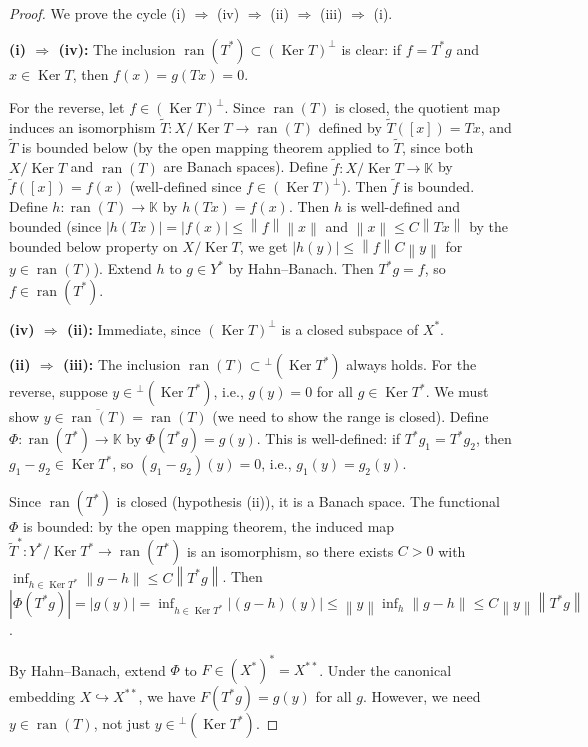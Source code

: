 \documentclass[a4paper,12pt]{book}
\DeclareMathOperator{\Ker}{Ker}
\DeclareMathOperator{\ran}{ran}
\newcommand{\K}{\mathbb{K}}
\newcommand{\norm}[1]{\left\| #1 \right\|}
\newcommand{\abs}[1]{\left| #1 \right|}
\theoremstyle{definition}
\theoremstyle{plain}
\theoremstyle{remark}
\begin{document}
\begin{proof}
We prove the cycle (i) $\Rightarrow$ (iv) $\Rightarrow$ (ii) $\Rightarrow$
(iii) $\Rightarrow$ (i).

\textbf{(i) $\Rightarrow$ (iv):}
The inclusion $\ran(T^*) \subset (\Ker T)^\perp$ is clear: if $f = T^*g$ and
$x \in \Ker T$, then $f(x) = g(Tx) = 0$.

For the reverse, let $f \in (\Ker T)^\perp$. Since $\ran(T)$ is closed, the
quotient map induces an isomorphism $\tilde{T} \colon X/\Ker T \to \ran(T)$
defined by $\tilde{T}([x]) = Tx$, and $\tilde{T}$ is bounded below (by the open
mapping theorem applied to $\tilde{T}$, since both $X/\Ker T$ and $\ran(T)$ are
Banach spaces). Define $\tilde{f} \colon X/\Ker T \to \K$ by $\tilde{f}([x]) = f(x)$
(well-defined since $f \in (\Ker T)^\perp$). Then $\tilde{f}$ is bounded. Define
$h \colon \ran(T) \to \K$ by $h(Tx) = f(x)$. Then $h$ is well-defined and bounded
(since $\abs{h(Tx)} = \abs{f(x)} \leq \norm{f}\norm{x}$ and $\norm{x} \leq
C\norm{Tx}$ by the bounded below property on $X/\Ker T$, we get
$\abs{h(y)} \leq \norm{f}C\norm{y}$ for $y \in \ran(T)$). Extend $h$ to
$g \in Y^*$ by Hahn--Banach. Then $T^*g = f$, so $f \in \ran(T^*)$.

\textbf{(iv) $\Rightarrow$ (ii):} Immediate, since $(\Ker T)^\perp$ is a closed
subspace of $X^*$.

\textbf{(ii) $\Rightarrow$ (iii):}
The inclusion $\ran(T) \subset {}^\perp(\Ker T^*)$ always holds. For the reverse,
suppose $y \in {}^\perp(\Ker T^*)$, i.e., $g(y) = 0$ for all $g \in \Ker T^*$.
We must show $y \in \overline{\ran(T)} = \ran(T)$ (we need to show the range is
closed). Define $\Phi \colon \ran(T^*) \to \K$ by $\Phi(T^*g) = g(y)$. This is
well-defined: if $T^*g_1 = T^*g_2$, then $g_1 - g_2 \in \Ker T^*$, so
$(g_1 - g_2)(y) = 0$, i.e., $g_1(y) = g_2(y)$.

Since $\ran(T^*)$ is closed (hypothesis (ii)), it is a Banach space. The functional
$\Phi$ is bounded: by the open mapping theorem, the induced map
$\tilde{T}^* \colon Y^*/\Ker T^* \to \ran(T^*)$ is an isomorphism, so there exists
$C > 0$ with $\inf_{h \in \Ker T^*} \norm{g - h} \leq C \norm{T^*g}$. Then
$\abs{\Phi(T^*g)} = \abs{g(y)} = \inf_{h \in \Ker T^*}\abs{(g-h)(y)} \leq
\norm{y}\inf_{h}\norm{g-h} \leq C\norm{y}\norm{T^*g}$.

By Hahn--Banach, extend $\Phi$ to $F \in (X^*)^* = X^{**}$. Under the canonical
embedding $X \hookrightarrow X^{**}$, we have $F(T^*g) = g(y)$ for all $g$.
However, we need $y \in \ran(T)$, not just $y \in {}^\perp(\Ker T^*)$.


\end{proof}
\end{document}
